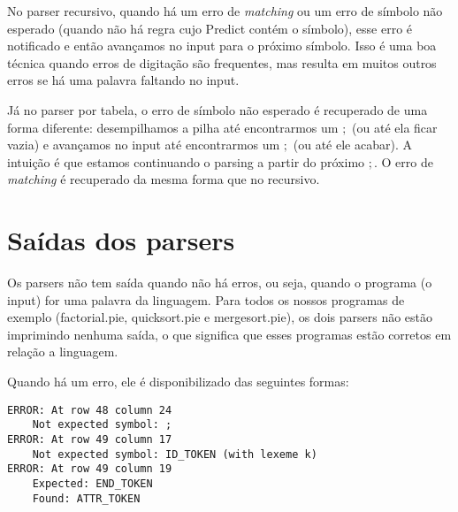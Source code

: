 No parser recursivo, quando há um erro de \textit{matching} ou um erro de símbolo não esperado (quando não há regra cujo Predict contém o símbolo), esse erro é notificado e então avançamos no input para o próximo símbolo. Isso é uma boa técnica quando erros de digitação são frequentes, mas resulta em muitos outros erros se há uma palavra faltando no input. 

Já no parser por tabela, o erro de símbolo não esperado é recuperado de uma forma diferente: desempilhamos a pilha até encontrarmos um $;$ (ou até ela ficar vazia) e avançamos no input até encontrarmos um $;$ (ou até ele acabar). A intuição é que estamos continuando o parsing a partir do próximo $;$. O erro de \textit{matching} é recuperado da mesma forma que no recursivo.

\section{Saídas dos parsers}
Os parsers não tem saída quando não há erros, ou seja, quando o programa (o input) for uma palavra da linguagem. Para todos os nossos programas de exemplo (factorial.pie, quicksort.pie e mergesort.pie), os dois parsers não estão imprimindo nenhuma saída, o que significa que esses programas estão corretos em relação a linguagem.

Quando há um erro, ele é disponibilizado das seguintes formas:
\vspace{0.5cm}

\begin{verbatim}
ERROR: At row 48 column 24 
    Not expected symbol: ;
ERROR: At row 49 column 17 
    Not expected symbol: ID_TOKEN (with lexeme k)
ERROR: At row 49 column 19
    Expected: END_TOKEN
    Found: ATTR_TOKEN
\end{verbatim} 



